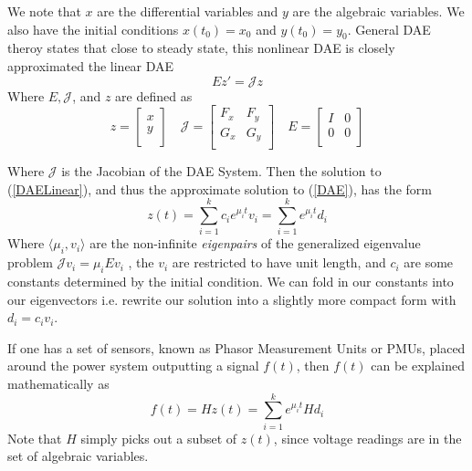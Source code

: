 We note that $x$ are the differential variables and $y$ are the algebraic variables. We also have the initial conditions $x(t_0) = x_0$ and $y(t_0) = y_0$. General DAE theroy states that close to steady state, this nonlinear DAE is closely approximated the linear DAE \cite{perko2013differential}
\begin{equation} \label{DAELinear}
Ez' = \mathcal{J} z
\end{equation}
Where $E, \mathcal{J} $, and $z$ are defined as 
\begin{equation}
z = 
\begin{bmatrix}
    x \\
    y \\
\end{bmatrix}
\quad
\mathcal{J}  = 
\begin{bmatrix}
    F_{x} & F_{y} \\
    G_{x} & G_{y} \\
\end{bmatrix}
\quad 
E = 
\begin{bmatrix}
    I & 0 \\
    0 & 0 \\
\end{bmatrix}
\end{equation}

Where $\mathcal{J}$ is the Jacobian of the DAE System. Then the solution to (\ref{DAELinear}), and thus the approximate solution to (\ref{DAE}), has the form
\begin{equation}\label{DAESolution}
z(t) = \sum_{i = 1}^{k} c_i e^{\mu_it}v_i = \sum_{i = 1}^{k} e^{\mu_it}d_i
\end{equation}
Where $ \langle \mu_i,v_i \rangle$ are the non-infinite \textit{eigenpairs} of the generalized eigenvalue problem $\mathcal{J} v_i = \mu_i Ev_i $  \cite{kunkel2006differential}, the $v_i$ are restricted to have unit length, and $c_i$ are some constants determined by the initial condition. We can fold in our constants into our eigenvectors i.e. rewrite our solution into a slightly more compact form with $d_i = c_i v_i$. 

If one has a set of sensors, known as Phasor Measurement Units or PMUs, placed around the power system outputting a signal $f(t)$, then $f(t)$ can be explained mathematically as 
\begin{equation}\label{PMUSolution}
f(t) = Hz(t) = \sum_{i = 1}^{k} e^{\mu_it}Hd_i
\end{equation}
Note that $H$ simply picks out a subset of $z(t)$, since voltage readings are in the set of algebraic variables. 

